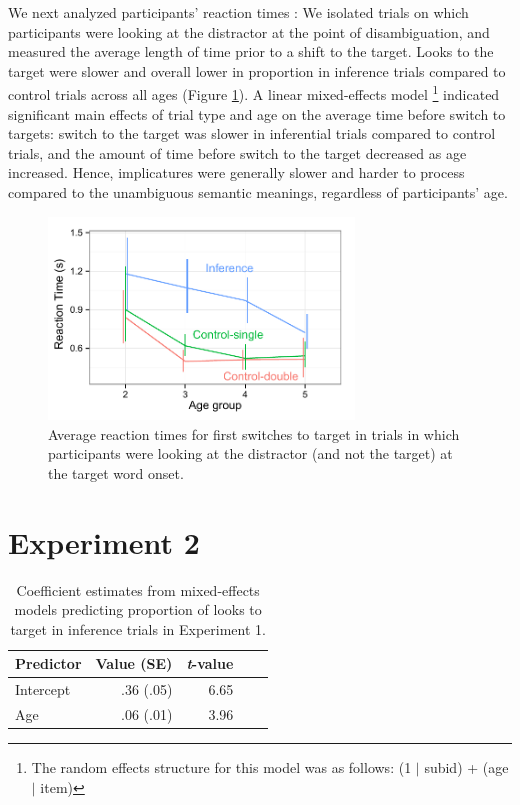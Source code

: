 \documentclass[10pt,letterpaper]{article}
\begin{document}
We next analyzed participants' reaction times \cite{fernald2008looking}: We isolated trials on which participants were looking at the distractor at the point of disambiguation, and measured the average length of time prior to a shift to the target. Looks to the target were slower and overall lower in proportion in inference trials compared to control trials across all ages (Figure \ref{fig:rt}). A linear mixed-effects model \footnote{The random effects structure for this model was as follows: (1 $|$ subid) + (age $|$ item)} indicated significant main effects of trial type and age on the average time before switch to targets: switch to the target was slower in inferential trials compared to control trials, and the amount of time before switch to the target decreased as age increased. Hence, implicatures were generally slower and harder to process compared to the unambiguous semantic meanings, regardless of participants' age. 

\begin{figure}
\begin{centering} 
\includegraphics[width=3.2in]{figures/expt1-rt.pdf}
\caption{\label{fig:rt} Average reaction times for first switches to target in trials in which participants were looking at the distractor (and not the target) at the target word onset.}
\end{centering} 
\end{figure}

\section{Experiment 2}

\begin{table}[b!]
\caption{\label{tab:lmer2}  Coefficient estimates from mixed-effects models predicting proportion of looks to target in inference trials in Experiment 1.} 
\begin{center} 
\begin{tabular}{l r r r l} 
\hline
Predictor  &  Value (SE) & \emph{t}-value\\
\hline
Intercept  & .36 (.05) & 6.65 \\
Age & .06 (.01) &  3.96 \\
\hline
\end{tabular} 
\end{center} 
\end{table}
\end{document}
